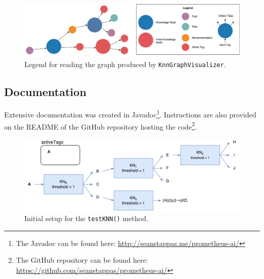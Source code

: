 \documentclass[titlepage,11pt]{article}
\newcommand{\code}[1]{\texttt{#1}}
\begin{document}
\begin{figure}[!htb]
	\includegraphics[width=\textwidth]{figures/knn_graph_legend.pdf}
	\caption{Legend for reading the graph produced by \code{KnnGraphVisualizer}.}
	\label{fig:knn_graph_legend}
\end{figure}

\subsection{Documentation}
Extensive documentation was created in Javadoc\footnote{The Javadoc can be found here: \url{http://seanstappas.me/prometheus-ai/}}. Instructions are also provided on the README of the GitHub repository hosting the code\footnote{The GitHub repository can be found here: \url{https://github.com/seanstappas/prometheus-ai/}}.

\begin{figure}[!htb]
	\includegraphics[width=\textwidth]{figures/testKNN.pdf}
	\caption[Setup for the \code{testKNN()} method.]
	{Initial setup for the \code{testKNN()} method.}
	\label{testKNN}
\end{figure}
\end{document}
